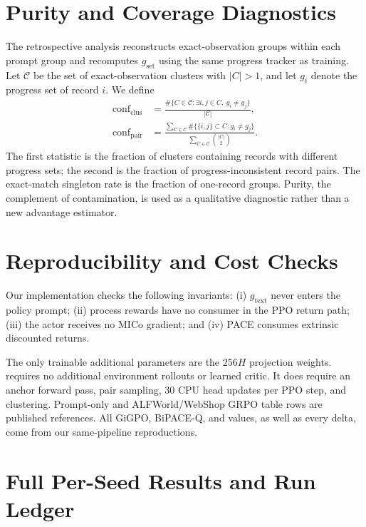 \section{Purity and Coverage Diagnostics}
\label{app:purity}

The retrospective analysis reconstructs exact-observation groups within each prompt group and recomputes $g_{\mathrm{set}}$ using the same progress tracker as training. Let $\mathcal{C}$ be the set of exact-observation clusters with $|C|>1$, and let $g_i$ denote the progress set of record $i$. We define
\begingroup
\setlength{\abovedisplayskip}{5pt}
\setlength{\belowdisplayskip}{5pt}
\begin{align}
\operatorname{conf}_{\mathrm{clus}} &=
\frac{\#\{C\in\mathcal{C}:\exists i,j\in C,\ g_i\neq g_j\}}
{|\mathcal{C}|}, \label{eq:conf_clus}\\
\operatorname{conf}_{\mathrm{pair}} &=
\frac{\sum_{C\in\mathcal{C}}\#\{\{i,j\}\subset C:g_i\neq g_j\}}
{\sum_{C\in\mathcal{C}}\binom{|C|}{2}}. \label{eq:conf_pair}
\end{align}
\endgroup
The first statistic is the fraction of clusters containing records with different progress sets; the second is the fraction of progress-inconsistent record pairs. The exact-match singleton rate is the fraction of one-record groups. Purity, the complement of contamination, is used as a qualitative diagnostic rather than a new advantage estimator.

\section{Reproducibility and Cost Checks}
\label{app:repro}

Our implementation checks the following invariants: (i) $g_{\mathrm{text}}$ never enters the policy prompt; (ii) process rewards have no consumer in the PPO return path; (iii) the actor receives no MICo gradient; and (iv) PACE consumes extrinsic discounted returns.

The only trainable additional parameters are the $256H$ projection weights. \method requires no additional environment rollouts or learned critic. It does require an anchor forward pass, pair sampling, 30 CPU head updates per PPO step, and clustering. Prompt-only and ALFWorld/WebShop GRPO table rows are published references. All GiGPO, BiPACE-Q, and \method values, as well as every \method delta, come from our same-pipeline reproductions.

\section{Full Per-Seed Results and Run Ledger}
\label{app:per_seed}


